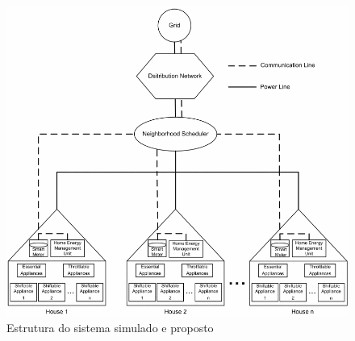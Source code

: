\begin{frame}  
  \begin{figure}[h]
  	\begin{center}
      \includegraphics [scale=0.3]{./Figures/result1}
      \caption {Estrutura do sistema simulado e proposto}
  	\end{center}
  \end{figure}
\end{frame}

